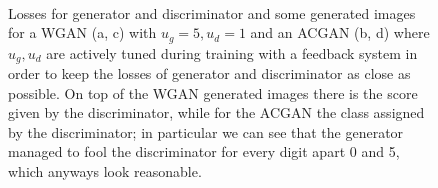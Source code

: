 \documentclass[a4paper, 11pt]{article}
\begin{document}
  \begin{figure}
    \centering
     \quad
     \\
     \quad
    \caption{Losses for generator and discriminator and some generated images for a WGAN (a, c) with $u_g = 5, u_d = 1$ and an ACGAN (b, d) where $u_g, u_d$ are actively tuned during training with a feedback system in order to keep the losses of generator and discriminator as close as possible. On top of the WGAN generated images there is the score given by the discriminator, while for the ACGAN the class assigned by the discriminator; in particular we can see that the generator managed to fool the discriminator for every digit apart 0 and 5, which anyways look reasonable.}
    \label{fig:GAN}
  \end{figure}
\end{document}
